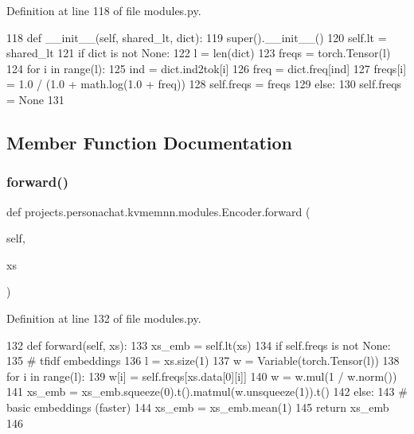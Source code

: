 Definition at line 118 of file modules.\+py.


\begin{DoxyCode}
118     \textcolor{keyword}{def }\_\_init\_\_(self, shared\_lt, dict):
119         super().\_\_init\_\_()
120         self.lt = shared\_lt
121         \textcolor{keywordflow}{if} dict \textcolor{keywordflow}{is} \textcolor{keywordflow}{not} \textcolor{keywordtype}{None}:
122             l = len(dict)
123             freqs = torch.Tensor(l)
124             \textcolor{keywordflow}{for} i \textcolor{keywordflow}{in} range(l):
125                 ind = dict.ind2tok[i]
126                 freq = dict.freq[ind]
127                 freqs[i] = 1.0 / (1.0 + math.log(1.0 + freq))
128             self.freqs = freqs
129         \textcolor{keywordflow}{else}:
130             self.freqs = \textcolor{keywordtype}{None}
131 
\end{DoxyCode}


\subsection{Member Function Documentation}
\mbox{\label{classprojects_1_1personachat_1_1kvmemnn_1_1modules_1_1Encoder_a06627a5af4545ab9baad60440ad4e9bb}} 
\subsubsection{\texorpdfstring{forward()}{forward()}}
{\footnotesize\ttfamily def projects.\+personachat.\+kvmemnn.\+modules.\+Encoder.\+forward (\begin{DoxyParamCaption}\item[{}]{self,  }\item[{}]{xs }\end{DoxyParamCaption})}



Definition at line 132 of file modules.\+py.


\begin{DoxyCode}
132     \textcolor{keyword}{def }forward(self, xs):
133         xs\_emb = self.lt(xs)
134         \textcolor{keywordflow}{if} self.freqs \textcolor{keywordflow}{is} \textcolor{keywordflow}{not} \textcolor{keywordtype}{None}:
135             \textcolor{comment}{# tfidf embeddings}
136             l = xs.size(1)
137             w = Variable(torch.Tensor(l))
138             \textcolor{keywordflow}{for} i \textcolor{keywordflow}{in} range(l):
139                 w[i] = self.freqs[xs.data[0][i]]
140             w = w.mul(1 / w.norm())
141             xs\_emb = xs\_emb.squeeze(0).t().matmul(w.unsqueeze(1)).t()
142         \textcolor{keywordflow}{else}:
143             \textcolor{comment}{# basic embeddings (faster)}
144             xs\_emb = xs\_emb.mean(1)
145         \textcolor{keywordflow}{return} xs\_emb
146 \end{DoxyCode}


